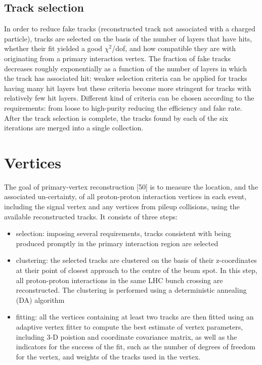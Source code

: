 \subsection{Track selection}
In order to reduce fake tracks (reconstructed track not associated with a charged particle), tracks are selected on the basis of the number of layers that have hits, whether their fit yielded a good $\chi^2$/dof, and how compatible they are with originating from a primary interaction vertex. The fraction of fake tracks decreases roughly exponentially as a function of the number of layers in which the track has associated hit: weaker selection criteria can be applied for tracks having many hit layers but these criteria become more stringent for tracks with relatively few hit layers. Different kind of criteria can be chosen according to the requirements: from loose to high-purity reducing the efficiency and fake rate. After the track selection is complete, the tracks found by each of the six iterations are merged into a single collection.

\section{Vertices}
The goal of primary-vertex reconstruction [50] is to measure the location, and the associated un-certainty, of all proton-proton interaction vertices in each event, including the signal vertex and any vertices from pileup collisions, using the available reconstructed tracks. It consists of three steps:
\begin{itemize}
\item selection: imposing several requirements, tracks consistent with being produced promptly in the primary interaction region are selected
\item clustering: the selected tracks are clustered on the basis of their z-coordinates at their point of closest approach to the centre of the beam spot. In this step, all proton-proton interactions in the same LHC bunch crossing are reconstructed. The clustering is performed using a deterministic annealing (DA) algorithm \cite{DA_vertex}
\item fitting: all the vertices containing at least two tracks are then fitted using an adaptive vertex fitter \cite{AVF_vertex} to compute the best estimate of vertex parameters, including 3-D poistion and coordinate covariance matrix, as well as the indicators for the success of the fit, such as the number of degrees of freedom for the vertex, and weights of the tracks used in the vertex.
\end{itemize}

